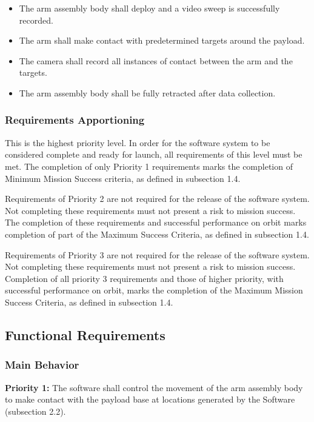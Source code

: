 \begin{itemize}
\item{The arm assembly body shall deploy and a video sweep is successfully recorded.}
\item{The arm shall make contact with predetermined targets around the payload.}
\item{The camera shall record all instances of contact between the arm and the targets.}
\item{The arm assembly body shall be fully retracted after data collection.}
\end{itemize}

\subsubsection{Requirements Apportioning}

This is the highest priority level. In order for the software system to be considered complete and ready for launch, all requirements of this level must be met.
The completion of only Priority 1 requirements marks the completion of Minimum Mission Success criteria, as defined in subsection 1.4.

Requirements of Priority 2 are not required for the release of the software system.
Not completing these requirements must not present a risk to mission success.
The completion of these requirements and successful performance on orbit marks completion of part of the Maximum Success Criteria, as defined in subsection 1.4.

Requirements of Priority 3 are not required for the release of the software system.
Not completing these requirements must not present a risk to mission success.
Completion of all priority 3 requirements and those of higher priority, with successful performance on orbit, marks the completion of the Maximum Mission Success Criteria, as defined in subsection 1.4.

\subsection{Functional Requirements}

\subsubsection{Main Behavior}
\textbf{Priority 1:}
The software shall control the movement of the arm assembly body to make contact with the payload base
at locations generated by the Software (subsection 2.2). 

